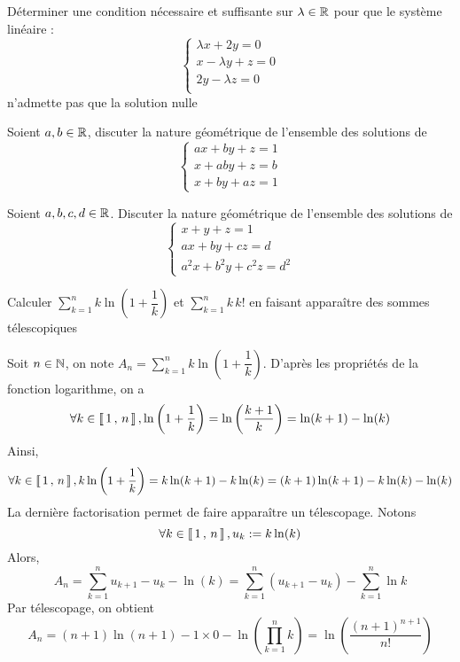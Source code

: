\documentclass[mathmodern,openany,11pt]{livre}
\begin{document}
\begin{exercice}
Déterminer une condition nécessaire et suffisante sur $\lambda\in\mathbb{R}$ pour que le système linéaire :
\[\left\{\begin{array}{l}
\lambda x+2y=0\\
x-\lambda y+z=0\\
2y-\lambda z=0\\
\end{array}\right.
\]
n'admette pas que la solution nulle
\end{exercice}

\begin{exercice}
Soient $a, b \in\mathbb{R}$, discuter la nature géométrique de l'ensemble des solutions de 
\[
\left\{\begin{array}{l}
ax+by+z=1\\
x+aby+z=b\\
x+by+az=1
\end{array}\right.
\]
\end{exercice}

\begin{exercice}
Soient $a,b,c,d\in\mathbb{R}$. Discuter la nature géométrique de l'ensemble des solutions de 
\[
\left\{\begin{array}{l}
x+y+z=1\\
ax+by+cz=d\\
a^2 x+b^2 y+c^2 z=d^2
\end{array}\right.
\]
\end{exercice}


\begin{exercice}
Calculer $\displaystyle\sum\limits_{k=1}^{n} k \ln\left(1+\dfrac{1}{k}\right)$ et $\displaystyle\sum\limits_{k=1}^{n}k \, k!$ en faisant apparaître des sommes télescopiques 
\end{exercice}

\begin{solution}
Soit $n \in \mathbb{N}$, on note $A_n = \displaystyle\sum\limits_{k=1}^{n} k \ln\left(1+\dfrac{1}{k}\right)$. D'après les propriétés de la fonction logarithme, on a 
\[
\forall k \in \left\llbracket \, 1 \, , \, n \, \right\rrbracket, 
\ln\left(1+\dfrac{1}{k}\right)
= \ln\left(\dfrac{k+ 1}{k}\right) 
= \ln(k+1) - \ln(k) 
\]
Ainsi, 
\[
\forall k \in \left\llbracket \, 1 \, , \, n \, \right\rrbracket, 
k  \ln\left(1+\dfrac{1}{k}\right)
= k  \ln(k+1) - k \ln(k) 
= (k + 1)  \ln(k+1) - k \ln(k) - \ln(k)
\]
La dernière factorisation permet de faire apparaître un télescopage. Notons
\[
\forall k \in \left\llbracket \, 1 \, , \, n \, \right\rrbracket, u_k :=  k \ln(k)
\]
Alors, 
\[
A_n 
= \displaystyle\sum\limits_{k=1}^{n} u_{k+1} - u_{k} - \ln(k) =  \displaystyle\sum\limits_{k=1}^{n} (u_{k+1} - u_{k}) - \displaystyle\sum\limits_{k=1}^{n}\ln{k}
\]
Par télescopage, on obtient 
\[
A_n = (n+1)\ln(n+1) - 1 \times 0 - \ln\left(\displaystyle\prod\limits_{k=1}^{n} k\right) = \ln\left(\dfrac{(n+1)^{n+1}}{n!}\right)
\]
\end{solution}
\end{document}
